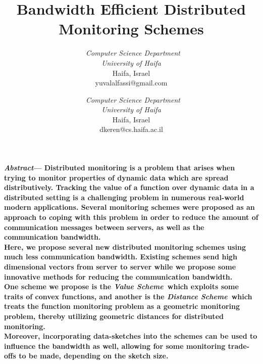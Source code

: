 \documentclass[10pt, conference]{IEEEtran}
\newcommand{\valueScheme}{\textit{Value Scheme}}
\newcommand{\distanceScheme}{\textit{Distance Scheme}}
\begin{document}
\title{Bandwidth Efficient Distributed Monitoring Schemes}
\author{\
\textit{Computer Science Department}\\
\textit{University of Haifa}\\
Haifa, Israel \\
yuvalalfassi@gmail.com
\and
{}\
\textit{Computer Science Department}\\
\textit{University of Haifa}\\
Haifa, Israel \\
dkeren@cs.haifa.ac.il}
\maketitle


\begin{small}
\textbf{
\textit{Abstract}--- Distributed monitoring is a problem that arises when trying to monitor properties of dynamic data which are spread distributively. Tracking the value of a function over dynamic data in a distributed setting is a challenging problem in numerous real-world modern applications. Several monitoring schemes were proposed as an approach to coping with this problem in order to reduce the amount of communication messages between servers, as well as the communication bandwidth. \\
Here, we propose several new distributed monitoring schemes using much less communication bandwidth. Existing schemes send high dimensional vectors from server to server while we propose some innovative methods for reducing the communication bandwidth.\\
One scheme we propose is the \valueScheme \ which exploits some traits of convex functions, and another is the \distanceScheme \ which treats the function monitoring problem as a geometric monitoring problem, thereby utilizing geometric distances for distributed monitoring. \\
Moreover, incorporating data-sketches into the schemes can be used to influence the bandwidth as well, allowing for some monitoring trade-offs to be made, depending on the sketch size.  }
\end{small}

\end{document}
